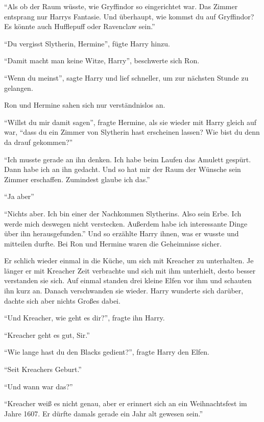 \enquote{Als ob der Raum wüsste, wie Gryffindor so eingerichtet war. Das Zimmer entsprang nur Harrys Fantasie. Und überhaupt, wie kommst du auf Gryffindor? Es könnte auch Hufflepuff oder Ravenclaw sein.}

\enquote{Du vergisst Slytherin, Hermine}, fügte Harry hinzu.

\enquote{Damit macht man keine Witze, Harry}, beschwerte sich Ron.

\enquote{Wenn du meinst}, sagte Harry und lief schneller, um zur nächsten Stunde zu gelangen.

Ron und Hermine sahen sich nur verständnislos an.

\enquote{Willst du mir damit sagen}, fragte Hermine, als sie wieder mit Harry gleich auf war, \enquote{dass du ein Zimmer von Slytherin hast erscheinen lassen? Wie bist du denn da drauf gekommen?}

\enquote{Ich musste gerade an ihn denken. Ich habe beim Laufen das Amulett gespürt. Dann habe ich an ihn gedacht. Und so hat mir der Raum der Wünsche sein Zimmer erschaffen. Zumindest glaube ich das.}

\enquote{Ja aber\abs}

\enquote{Nichts aber. Ich bin einer der Nachkommen Slytherins. Also sein Erbe. Ich werde mich deswegen nicht verstecken. Außerdem habe ich interessante Dinge über ihn herausgefunden.} Und so erzählte Harry ihnen, was er wusste und mitteilen durfte. Bei Ron und Hermine waren die Geheimnisse sicher.

\trenn

Er schlich wieder einmal in die Küche, um sich mit Kreacher zu unterhalten. Je länger er mit Kreacher Zeit verbrachte und sich mit ihm unterhielt, desto besser verstanden sie sich. Auf einmal standen drei kleine Elfen vor ihm und schauten ihn kurz an. Danach verschwanden sie wieder. Harry wunderte sich darüber, dachte sich aber nichts Großes dabei.

\enquote{Und Kreacher, wie geht es dir?}, fragte ihn Harry.

\enquote{Kreacher geht es gut, Sir.}

\enquote{Wie lange hast du den Blacks gedient?}, fragte Harry den Elfen.

\enquote{Seit Kreachers Geburt.}

\enquote{Und wann war das?}

\enquote{Kreacher weiß es nicht genau, aber er erinnert sich an ein Weihnachtsfest im Jahre 1607. Er dürfte damals gerade ein Jahr alt gewesen sein.}

